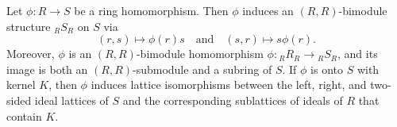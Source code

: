 Let $\phi: R \to S$ be a ring homomorphism. Then $\phi$ induces an $(R,R)$-bimodule structure ${}_R S_R$ on $S$ via
$$(r, s) \mapsto \phi(r)s \quad \text{and} \quad (s, r) \mapsto s\phi(r).$$
Moreover, $\phi$ is an $(R,R)$-bimodule homomorphism $\phi: {}_R R_R \to {}_R S_R$, and its image is both an $(R,R)$-submodule and a subring of $S$. If $\phi$ is onto $S$ with kernel $K$, then $\phi$ induces lattice isomorphisms between the left, right, and two-sided ideal lattices of $S$ and the corresponding sublattices of ideals of $R$ that contain $K$.
